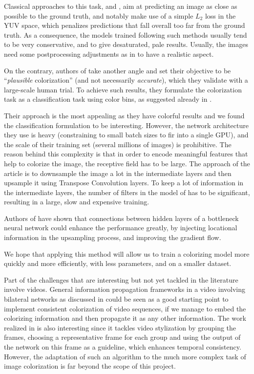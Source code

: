 \documentclass[10pt,twocolumn,letterpaper]{article}
\begin{document}
Classical approaches to this task, \eg \cite{cheng2015deep} and \cite{dahl2016tinyclouds}, aim at predicting an image as close as possible to the ground truth, and notably make use of a simple $L_2$ loss in the YUV space, which penalizes predictions that fall overall too far from the ground truth. As a consequence, the models trained following such methods usually tend to be very conservative, and to give desaturated, pale results. Usually, the images need some postprocessing adjustments as in \cite{deshpande2015learning} to have a realistic aspect.

On the contrary, authors of \cite{zhang2016colorful} take another angle and set their objective to be ``\textit{plausible} colorization'' (and not necessarily \textit{accurate}), which they validate with a large-scale human trial. To achieve such results, they formulate the colorization task as a classification task using color bins, as suggested already in \cite{charpiat2008automatic}.

Their approach is the most appealing as they have colorful results and we found the classification formulation to be interesting. However, the network architecture they use is heavy (constraining to small batch sizes to fir into a single GPU), and the scale of their training set (several millions of images) is prohibitive. The reason behind this complexity is that in order to encode meaningful features that help to colorize the image, the receptive field has to be large. The approach of the article is to downsample the image a lot in the intermediate layers and then upsample it using Transpose Convolution layers. To keep a lot of information in the intermediate layers, the number of filters in the model of \cite{zhang2016colorful} has to be significant, resulting in a large, slow and expensive training.

Authors of \cite{ronneberger2015unet} have shown that connections between hidden layers of a bottleneck neural network could enhance the performance greatly, by injecting locational information in the upsampling process, and improving the gradient flow.

We hope that applying this method will allow us to train a colorizing model more quickly and more efficiently, with less parameters, and on a smaller dataset.

Part of the challenges that are interesting but not yet tackled in the literature involve videos. General information propagation frameworks in a video involving bilateral networks as discussed in \cite{jampani2017video} could be seen as a good starting point to implement consistent colorization of video sequences, if we manage to embed the colorizing information and then propagate it as any other information. The work realized in \cite{zhu2017video} is also interesting since it tackles video stylization by grouping the frames, choosing a representative frame for each group and using the output of the network on this frame as a guideline, which enhances temporal consistency. However, the adaptation of such an algorithm to the much more complex task of image colorization is far beyond the scope of this project.
\end{document}

